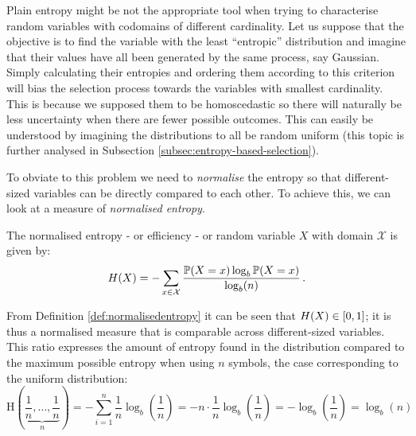 Plain entropy might be not the appropriate tool when trying to characterise random variables with codomains of different cardinality.
Let us suppose that the objective is to find the variable with the least \enquote{entropic} distribution and imagine that their values have all been generated by the same process, say Gaussian.
Simply calculating their entropies and ordering them according to this criterion will bias the selection process towards the variables with smallest cardinality.
This is because we supposed them to be homoscedastic so there will naturally be less uncertainty when there are fewer possible outcomes.
This can easily be understood by imagining the distributions to all be random uniform
(this topic is further analysed in Subsection \ref{subsec:entropy-based-selection}).

To obviate to this problem we need to \textit{normalise} the entropy so that different-sized variables can be directly compared to each other.
To achieve this, we can look at a measure of \textit{normalised entropy}.
\begin{definition} \label{def:normalisedentropy}
The normalised entropy - or efficiency - or random variable $X$ with domain $\mathcal{X}$ is given by:
	\begin{equation*} 
 	H(X)=-\sum\limits_{x \in \mathcal{X}} \frac{\mathbb{P}(X=x) \log _{b}\mathbb{P}(X=x)}{\log_{b}(n)} \,.
\end{equation*}
\end{definition}
From Definition \ref{def:normalisedentropy} it can be seen that $H(X) \in [0,1]$; it is thus a normalised measure that is comparable across different-sized variables.
This ratio expresses the amount of entropy found in the distribution compared to the maximum possible entropy when using $n$ symbols, the case corresponding to the uniform distribution:
\begin{equation}
\mathrm{H}\left(\underbrace{\frac{1}{n}, \ldots, \frac{1}{n}}_{n}\right) = - \sum\limits_{i=1}^n \frac{1}{n} \log _{b} \left( \frac{1}{n} \right) = -n \cdot \frac{1}{n} \log _{b} \left( \frac{1}{n} \right) = - \log _{b} \left( \frac{1}{n} \right) = \log _{b}(n) 
\end{equation}   

